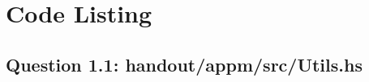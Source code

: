 \documentclass[12pt,a4paper]{article}
\begin{document}




\appendix
\section{Code Listing}
\subsection{Question 1.1: handout/appm/src/Utils.hs}
\label{appendix:question1-1}
\inputminted{haskell}{handout/appm/src/Utils.hs}
\end{document}
